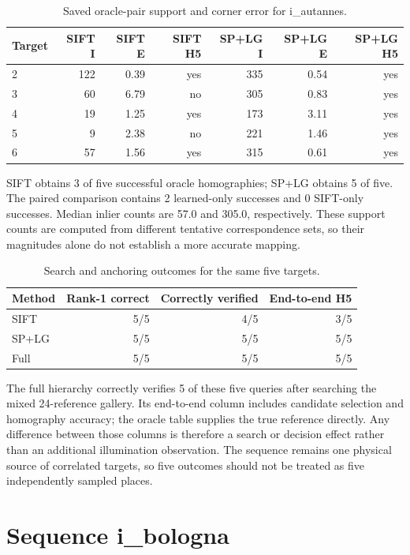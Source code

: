 \begin{table}[H]\centering\small
\caption{Saved oracle-pair support and corner error for i\_autannes.}\label{tab:hp-pairs-1}
\begin{tabular}{lrrrrrr}\toprule
Target & SIFT I & SIFT E & SIFT H5 & SP+LG I & SP+LG E & SP+LG H5 \\
\midrule
2 & 122 & 0.39 & yes & 335 & 0.54 & yes \\
3 & 60 & 6.79 & no & 305 & 0.83 & yes \\
4 & 19 & 1.25 & yes & 173 & 3.11 & yes \\
5 & 9 & 2.38 & no & 221 & 1.46 & yes \\
6 & 57 & 1.56 & yes & 315 & 0.61 & yes \\
\bottomrule\end{tabular}\end{table}


SIFT obtains 3 of five successful oracle homographies; SP+LG obtains 5 of five. The paired comparison contains 2 learned-only successes and 0 SIFT-only successes. Median inlier counts are 57.0 and 305.0, respectively. These support counts are computed from different tentative correspondence sets, so their magnitudes alone do not establish a more accurate mapping.

\begin{table}[H]\centering\small
\caption{Search and anchoring outcomes for the same five targets.}\label{tab:hp-end-1}
\begin{tabular}{lrrr}\toprule
Method & Rank-1 correct & Correctly verified & End-to-end H5 \\
\midrule
SIFT & 5/5 & 4/5 & 3/5 \\
SP+LG & 5/5 & 5/5 & 5/5 \\
Full & 5/5 & 5/5 & 5/5 \\
\bottomrule\end{tabular}\end{table}


The full hierarchy correctly verifies 5 of these five queries after searching the mixed 24-reference gallery. Its end-to-end column includes candidate selection and homography accuracy; the oracle table supplies the true reference directly. Any difference between those columns is therefore a search or decision effect rather than an additional illumination observation. The sequence remains one physical source of correlated targets, so five outcomes should not be treated as five independently sampled places.

\section{Sequence i\_bologna}

